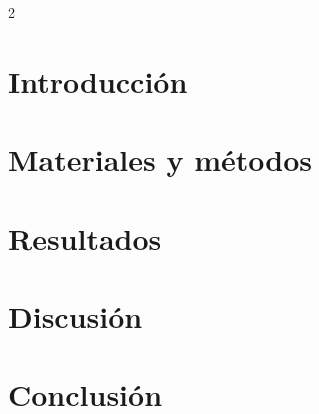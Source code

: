 
\Inicio{}{}{}

\Resumen{}{}


    \begin{multicols}{2}
    

\section{Introducción}
\section{Materiales y métodos}
\section{Resultados}
\section{Discusión}
\section{Conclusión}






\end{multicols}